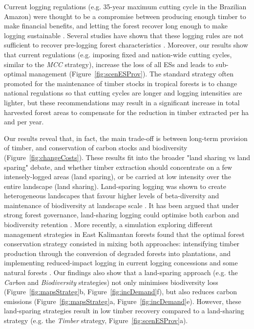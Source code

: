 \documentclass[12pt]{article}
\begin{document}
Current logging regulations (e.g. 35-year maximum cutting cycle in the Brazilian Amazon) were thought to be a compromise between producing enough timber to make financial benefits, and letting the forest recover long enough to make logging sustainable \cite{Seydack2012}. Several studies have shown that these logging rules are not sufficient to recover pre-logging forest characteristics \cite{Sist2007,Zimmerman2012,Piponiot2018}. Moreover, our results show that current regulations (e.g. imposing fixed and nation-wide cutting cycles, similar to the \textit{MCC} strategy), increase the loss of all ESs and leads to sub-optimal management (Figure~\ref{fig:scenESProv}). The standard strategy often promoted for the maintenance of timber stocks in tropical forests is to change national regulations so that cutting cycles are longer and logging intensities are lighter, but these recommendations may result in a significant increase in total harvested forest areas to compensate for the reduction in timber extracted per ha and per year.

Our results reveal that, in fact, the main trade-off is between long-term provision of timber, and conservation of carbon stocks and biodiversity (Figure~\ref{fig:changeCosts}). These results fit into the broader "land sharing vs land sparing" debate, and whether timber extraction should concentrate on a few intensely-logged areas (land sparing), or be carried at low intensity over the entire landscape (land sharing). Land-sparing logging was shown to create heterogeneous landscapes that favour higher levels of beta-diversity and maintenance of biodiversity at landscape scale \cite{DeCastroSolar2015,Edwards2014}. It has been argued that under strong forest governance, land-sharing logging could optimise both carbon and biodiversity retention \cite{Griscom2018}. More recently, a simulation exploring different management strategies in East Kalimantan forests found that the optimal forest conservation strategy consisted in mixing both approaches: intensifying timber production through the conversion of degraded forests into plantations, and implementing reduced-impact logging in current logging concessions and some natural forests \cite{Runting2018}. Our findings also show that a land-sparing approach (e.g. the \textit{Carbon} and \textit{Biodiversity} strategies) not only minimises biodiversity loss (Figure~\ref{fig:mapsStrateg}b, Figure~\ref{fig:incDemand}f), but also reduces carbon emissions (Figure~\ref{fig:mapsStrateg}a, Figure~\ref{fig:incDemand}e). However, these land-sparing strategies result in low timber recovery compared to a land-sharing strategy (e.g. the \textit{Timber} strategy, Figure~\ref{fig:scenESProv}a).
\end{document}
